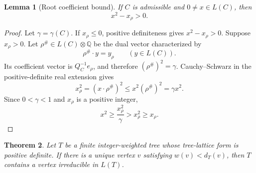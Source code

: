 \documentclass[11pt]{article}
\newtheorem{theorem}{Theorem}
\newtheorem{lemma}[theorem]{Lemma}
\begin{document}
\begin{lemma}[Root coefficient bound]\label{lem:root-bound}
If $C$ is admissible and $0\neq x\in L(C)$, then
\[
 x^2-x_\rho>0.
\]
\end{lemma}

\begin{proof}
Let $\gamma=\gamma(C)$.  If $x_\rho\leq0$, positive definiteness gives
$x^2-x_\rho>0$.  Suppose $x_\rho>0$.  Let
$\rho^\#\in L(C)\otimes\mathbb Q$ be the dual vector characterized by
\[
 \rho^\#\mathbin{\cdot}y=y_\rho\qquad(y\in L(C)).
\]
Its coefficient vector is $Q_C^{-1}e_\rho$, and therefore
$(\rho^\#)^2=\gamma$.  Cauchy--Schwarz in the positive-definite real
extension gives
\[
 x_\rho^2=(x\mathbin{\cdot}\rho^\#)^2
 \leq x^2(\rho^\#)^2=\gamma x^2.
\]
Since $0<\gamma<1$ and $x_\rho$ is a positive integer,
\[
 x^2\geq\frac{x_\rho^2}{\gamma}>x_\rho^2\geq x_\rho.
\]
\end{proof}

\begin{theorem}
Let $T$ be a finite integer-weighted tree whose tree-lattice form is positive
definite.  If there is a unique vertex $v$ satisfying
$w(v)<d_T(v)$, then $T$ contains a vertex irreducible in $L(T)$.
\end{theorem}
\end{document}
